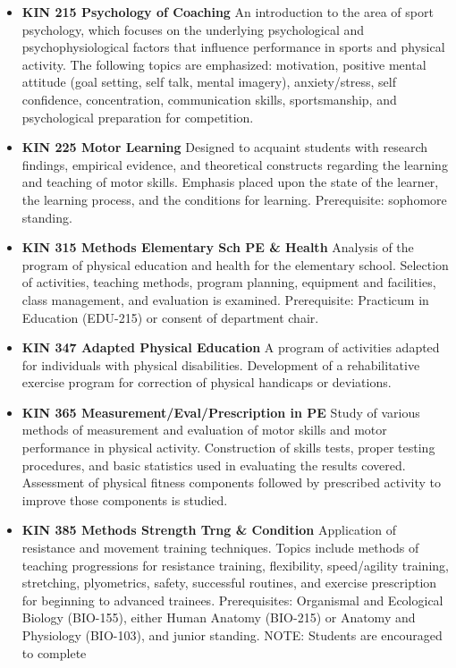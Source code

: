 \documentclass[
  letterpaper,
]{scrbook}
\begin{document}
\begin{itemize}
\item
  \textbf{KIN 215 Psychology of Coaching} An introduction to the area of
  sport psychology, which focuses on the underlying psychological and
  psychophysiological factors that influence performance in sports and
  physical activity. The following topics are emphasized: motivation,
  positive mental attitude (goal setting, self talk, mental imagery),
  anxiety/stress, self confidence, concentration, communication skills,
  sportsmanship, and psychological preparation for competition.
\item
  \textbf{KIN 225 Motor Learning} Designed to acquaint students with
  research findings, empirical evidence, and theoretical constructs
  regarding the learning and teaching of motor skills. Emphasis placed
  upon the state of the learner, the learning process, and the
  conditions for learning. Prerequisite: sophomore standing.
\item
  \textbf{KIN 315 Methods Elementary Sch PE \& Health} Analysis of the
  program of physical education and health for the elementary school.
  Selection of activities, teaching methods, program planning, equipment
  and facilities, class management, and evaluation is examined.
  Prerequisite: Practicum in Education (EDU-215) or consent of
  department chair.
\item
  \textbf{KIN 347 Adapted Physical Education} A program of activities
  adapted for individuals with physical disabilities. Development of a
  rehabilitative exercise program for correction of physical handicaps
  or deviations.
\item
  \textbf{KIN 365 Measurement/Eval/Prescription in PE} Study of various
  methods of measurement and evaluation of motor skills and motor
  performance in physical activity. Construction of skills tests, proper
  testing procedures, and basic statistics used in evaluating the
  results covered. Assessment of physical fitness components followed by
  prescribed activity to improve those components is studied.
\item
  \textbf{KIN 385 Methods Strength Trng \& Condition} Application of
  resistance and movement training techniques. Topics include methods of
  teaching progressions for resistance training, flexibility,
  speed/agility training, stretching, plyometrics, safety, successful
  routines, and exercise prescription for beginning to advanced
  trainees. Prerequisites: Organismal and Ecological Biology (BIO-155),
  either Human Anatomy (BIO-215) or Anatomy and Physiology (BIO-103),
  and junior standing. NOTE: Students are encouraged to complete

\end{itemize}
\end{document}

